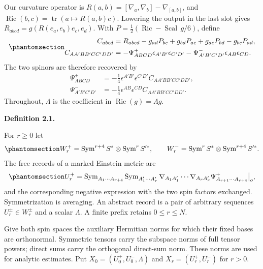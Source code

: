 \documentclass[
  english,
  11pt,
  reqno]{amsart}
\makeatletter
\newcommand{\pandocstatementheading}[1]{%
  \par\addpenalty{\@beginparpenalty}%
  \addvspace{.5\baselineskip plus .2\baselineskip minus .2\baselineskip}%
  {\normalfont\bfseries #1\par}%
  \nobreak\@afterindenttrue\@afterheading
}
\makeatother
\begin{document}
Our curvature operator is \(R(a,b)=[\nabla_a,\nabla_b]-\nabla_{[a,b]}\),
and \(\operatorname{Ric}(b,c)=\operatorname{tr}(a\mapsto R(a,b)c)\).
Lowering the output in the last slot gives
\(R_{abcd}=g(R(e_a,e_b)e_c,e_d)\). With
\(P=\tfrac12(\operatorname{Ric}-\operatorname{Scal}\,g/6)\), define
\begin{equation}\protect\phantomsection\label{eq:es-curvature-decomposition}{
 \begin{aligned}
 C_{abcd}&=R_{abcd}-g_{ad}P_{bc}+g_{bd}P_{ac}
                         +g_{ac}P_{bd}-g_{bc}P_{ad},\\
 C_{AA'BB'CC'DD'}
 &=-\Psi^+_{ABCD}\epsilon_{A'B'}\epsilon_{C'D'}
   -\Psi^-_{A'B'C'D'}\epsilon_{AB}\epsilon_{CD} .
 \end{aligned}
}\end{equation} The two spinors are therefore recovered by \[
 \begin{aligned}
 \Psi^+_{ABCD}&=-\tfrac14\epsilon^{A'B'}\epsilon^{C'D'}C_{AA'BB'CC'DD'},\\
 \Psi^-_{A'B'C'D'}&=-\tfrac14\epsilon^{AB}\epsilon^{CD}C_{AA'BB'CC'DD'} .
 \end{aligned}
\] Throughout, \(\Lambda\) is the coefficient in
\(\operatorname{Ric}(g)=\Lambda g\).

\pandocstatementheading{\protect{}\label{def:es-records}Definition 2.1.}

For \(r\ge0\) let
\begin{equation}\protect\phantomsection\label{eq:es-record-spaces}{
 W_r^+=\operatorname{Sym}^{r+4}S^*\otimes\operatorname{Sym}^{r}S'^*,
 \qquad
 W_r^-=\operatorname{Sym}^{r}S^*\otimes\operatorname{Sym}^{r+4}S'^* .
}\end{equation} The free records of a marked Einstein metric are
\begin{equation}\protect\phantomsection\label{eq:es-free-records}{
 U_r^+=\operatorname{Sym}_{A_1\cdots A_{r+4}}
       \operatorname{Sym}_{A'_1\cdots A'_r}
       \nabla_{A_1A'_1}\cdots\nabla_{A_rA'_r}
       \Psi^+_{A_{r+1}\cdots A_{r+4}}\big|_o,
}\end{equation} and the corresponding negative expression with the two
spin factors exchanged. Symmetrization is averaging. An abstract record
is a pair of arbitrary sequences \(U_r^\pm\in W_r^\pm\) and a scalar
\(\Lambda\). A finite prefix retains \(0\le r\le N\).

Give both spin spaces the auxiliary Hermitian norms for which their
fixed bases are orthonormal. Symmetric tensors carry the subspace norms
of full tensor powers; direct sums carry the orthogonal direct-sum norm.
These norms are used for analytic estimates. Put
\(X_0=(U_0^+,U_0^-,\Lambda)\) and \(X_r=(U_r^+,U_r^-)\) for \(r>0\).
\end{document}
